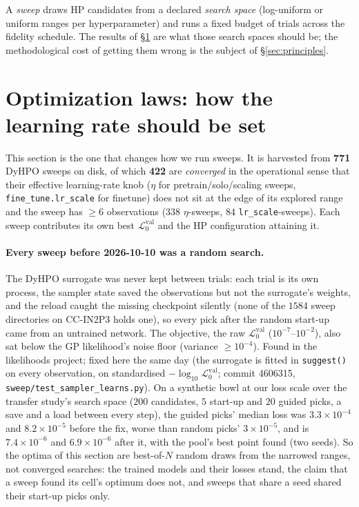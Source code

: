 \documentclass[11pt]{article}
\newcommand{\vlnr}{\mathcal{L}^{\mathrm{val}}_{0}}   %
\newcommand{\code}[1]{\texttt{#1}}
\begin{document}
A \emph{sweep} draws HP candidates from a declared \emph{search space} (log-uniform or
uniform ranges per hyperparameter) and runs a fixed budget of trials across the fidelity
schedule. The results of \S\ref{sec:lrlaw} are what those search spaces should be; the
methodological cost of getting them wrong is the subject of \S\ref{sec:principles}.

\section{Optimization laws: how the learning rate should be set}\label{sec:lrlaw}

This section is the one that changes how we run sweeps. It is harvested from
\textbf{771} DyHPO sweeps on disk, of which \textbf{422} are \emph{converged} in the
operational sense that their effective learning-rate knob ($\eta$ for pretrain/solo/scaling
sweeps, \code{fine\_tune.lr\_scale} for finetune) does not sit at the edge of its explored
range and the sweep has $\ge 6$ observations ($338$ $\eta$-sweeps, $84$
\code{lr\_scale}-sweeps). Each sweep contributes its own best $\vlnr$ and the HP
configuration attaining it.

\paragraph{Every sweep before 2026-10-10 was a random search.} The DyHPO surrogate was never kept between trials: each
trial is its own process, the sampler state saved the observations but not the surrogate's weights, and the reload
caught the missing checkpoint silently (none of the $1584$ sweep directories on CC-IN2P3 holds one), so every pick after
the random start-up came from an untrained network. The objective, the raw $\vlnr$ ($10^{-7}$--$10^{-2}$), also sat
below the GP likelihood's noise floor (variance $\ge10^{-4}$). Found in the likelihoods project; fixed here the same
day (the surrogate is fitted in \code{suggest()} on every observation, on standardised $-\log_{10}\vlnr$; commit
4606315, \code{sweep/test\_sampler\_learns.py}). On a synthetic bowl at our loss scale over the transfer study's search
space ($200$ candidates, $5$ start-up and $20$ guided picks, a save and a load between every step), the guided picks'
median loss was $3.3\times10^{-4}$ and $8.2\times10^{-5}$ before the fix, worse than random picks' $3\times10^{-5}$, and is
$7.4\times10^{-6}$ and $6.9\times10^{-6}$ after it, with the pool's best point found (two seeds). So the optima of this
section are best-of-$N$ random draws from the narrowed ranges, not converged searches: the trained models and their
losses stand, the claim that a sweep found its cell's optimum does not, and sweeps that share a seed shared their
start-up picks only.
\end{document}
